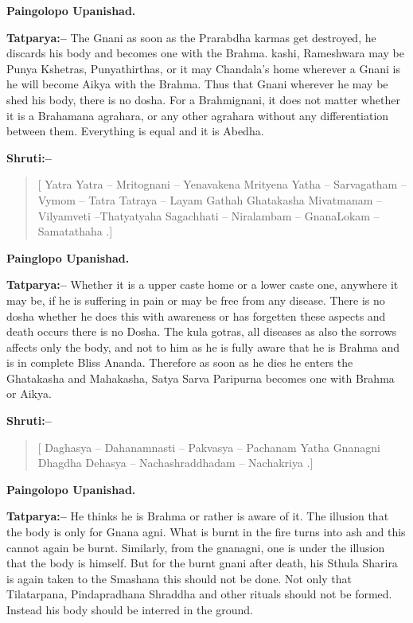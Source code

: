\begin{flushright}
\textbf{Paingolopo Upanishad.}
\end{flushright}

\textbf{Tatparya:–} The Gnani as soon as the Prarabdha karmas get destroyed, he discards his body and becomes one with the Brahma. kashi, Rameshwara may be Punya Kshetras, Punyathirthas, or it may Chandala's home wherever a Gnani is he will become Aikya with the Brahma. Thus that Gnani wherever he may be shed his body, there is no dosha. For a Brahmignani, it does not matter whether it is a Brahamana agrahara, or any other agrahara without any differentiation between them. Everything is equal and it is Abedha.

\textbf{Shruti:–}

\begin{verse}
[ Yatra Yatra – Mritognani – Yenavakena Mrityena  Yatha – Sarvagatham – Vymom – Tatra Tatraya – Layam Gathah  Ghatakasha Mivatmanam – Vilyamveti –Thatyatyaha  Sagachhati – Niralambam – GnanaLokam – Samatathaha .]
\end{verse}

\begin{flushright}
\textbf{Painglopo Upanishad.}
\end{flushright}

\textbf{Tatparya:–} Whether it is a upper caste home or a lower caste one, anywhere it may be, if he is suffering in pain or may be free from any disease. There is no dosha whether he does this with awareness or has forgetten these aspects and death occurs there is no Dosha. The kula gotras, all diseases as also the sorrows affects only the body, and not to him as he is fully aware that he is Brahma and is in complete Bliss Ananda. Therefore as soon as he dies he enters the Ghatakasha and Mahakasha, Satya Sarva Paripurna becomes one with Brahma or Aikya.

\textbf{Shruti:–}

\begin{verse}
[ Daghasya – Dahanamnasti – Pakvasya – Pachanam Yatha  Gnanagni Dhagdha Dehasya – Nachashraddhadam – Nachakriya .]
\end{verse}

\begin{flushright}
\textbf{Paingolopo Upanishad.}
\end{flushright}

\textbf{Tatparya:–} He thinks he is Brahma or rather is aware of it. The illusion that the body is only for Gnana agni. What is burnt in the fire turns into ash and this cannot again be burnt. Similarly, from the gnanagni, one is under the illusion that the body is himself. But for the burnt gnani after death, his Sthula Sharira is again taken to the Smashana this should not be done. Not only that Tilatarpana, Pindapradhana Shraddha and other rituals should not be formed. Instead his body should be interred in the ground.


